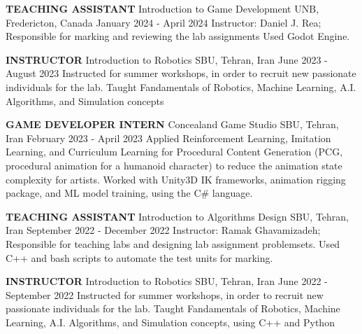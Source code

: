 \begin{cventries}
    \cventry
    {\textbf{TEACHING ASSISTANT}}
    {Introduction to Game Development}
    {UNB, Fredericton, Canada}
    {January 2024 - April 2024}
    {Instructor: Daniel J. Rea; Responsible for marking and reviewing the lab assignments \newline Used Godot Engine.}
    \vspace{0.4 cm}
\end{cventries}

\begin{cventries}
    \cventry
    {\textbf{INSTRUCTOR}}
    {Introduction to Robotics}
    {SBU, Tehran, Iran}
    {June 2023 - August 2023}
    {Instructed for summer workshops, in order to recruit new passionate individuals for the lab.
    \newline Taught Fandamentals of Robotics, Machine Learning, A.I. Algorithms, and Simulation concepts}
    \vspace{0.4 cm}
\end{cventries}

\begin{cventries}
    \cventry
    {\textbf{GAME DEVELOPER INTERN}}
    {Concealand Game Studio}
    {SBU, Tehran, Iran}
    {February 2023 - April 2023}
    {Applied Reinforcement Learning, Imitation Learning, and Curriculum Learning for Procedural Content Generation (PCG, procedural animation for a humanoid character) to reduce the animation state complexity for artists. 
    \newline Worked with Unity3D IK frameworks, animation rigging package, and ML model training, using the C\# language.}
\end{cventries}
\begin{cventries}
    \cventry
    {\textbf{TEACHING ASSISTANT}}
    {Introduction to Algorithms Design}
    {SBU, Tehran, Iran}
    {September 2022 - December 2022}
    {Instructor: Ramak Ghavamizadeh; Responsible for teaching labs and designing lab assignment problemsets.
    \newline Used C++ and bash scripts to automate the test units for marking.}
    \vspace{0.4 cm}
\end{cventries}

\begin{cventries}
    \cventry
    {\textbf{INSTRUCTOR}}
    {Introduction to Robotics}
    {SBU, Tehran, Iran}
    {June 2022 - September 2022}
    {Instructed for summer workshops, in order to recruit new passionate individuals for the lab.
    \newline Taught Fandamentals of Robotics, Machine Learning, A.I. Algorithms, and Simulation concepts, using C++ and Python}
    \vspace{0.4 cm}
\end{cventries}


